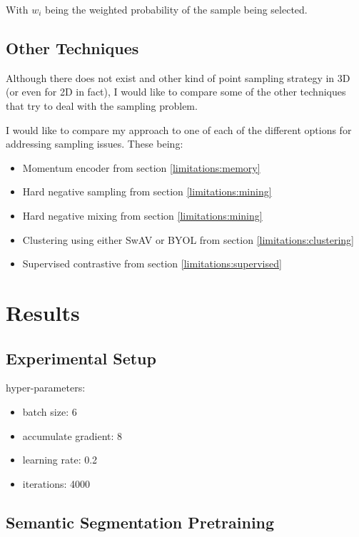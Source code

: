 \documentclass[12pt]{article}
\begin{document}
With $w_i$ being the weighted probability of the sample being selected.


\subsection{Other Techniques}

Although there does not exist and other kind of point sampling strategy in 3D (or even for 2D in fact), I would like to compare some of the other techniques that try to deal with the sampling problem.
%

I would like to compare my approach to one of each of the different options for addressing sampling issues. These being:

\begin{itemize}
    \item Momentum encoder from section \ref{limitations:memory}
    \item Hard negative sampling from section \ref{limitations:mining}
    \item Hard negative mixing from section \ref{limitations:mining}
    \item Clustering using either SwAV or BYOL from section \ref{limitations:clustering}
    \item Supervised contrastive from section \ref{limitations:supervised}
\end{itemize}

\pagebreak

\section{Results}

\subsection{Experimental Setup}

hyper-parameters:

\begin{itemize}
    \item batch size: 6
    \item accumulate gradient: 8
    \item learning rate: 0.2
    \item iterations: 4000
\end{itemize}

\subsection{Semantic Segmentation Pretraining}
\end{document}
